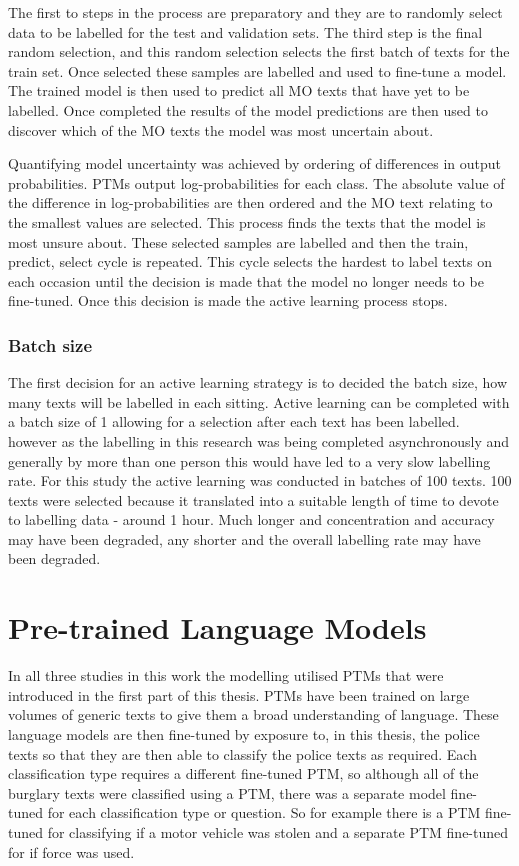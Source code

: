 The first to steps in the process are preparatory and they are to randomly select data to be labelled for the test and validation sets. The third step is the final random selection, and this random selection selects the first batch of texts for the train set. Once selected these samples are labelled and used to fine-tune a model. The trained model is then used to predict all MO texts that have yet to be labelled. Once completed the results of the model predictions are then used to discover which of the MO texts the model was most uncertain about. 

Quantifying model uncertainty was achieved by ordering of differences in output probabilities. PTMs output log-probabilities for each class. The absolute value of the difference in log-probabilities are then ordered and the MO text relating to the smallest values are selected. This process finds the texts that the model is most unsure about. These selected samples are labelled and then the train, predict, select cycle is repeated. This cycle selects the hardest to label texts on each occasion until the decision is made that the model no longer needs to be fine-tuned. Once this decision is made the active learning process stops. 


\subsubsection{Batch size}
The first decision for an active learning strategy is to decided the batch size, how many texts will be labelled in each sitting. Active learning can be completed with a batch size of 1 allowing for a selection after each text has been labelled. however as the labelling in this research was being completed asynchronously and generally by more than one person this would have led to a very slow labelling rate. For this study the active learning was conducted in batches of 100 texts. 100 texts were selected because it translated into a suitable length of time to devote to labelling data - around 1 hour. Much longer and concentration and accuracy may have been degraded, any shorter and the overall labelling rate may have been degraded. 


\section{Pre-trained Language Models} In all three studies in this work the modelling utilised PTMs that were introduced in the first part of this thesis. PTMs have been trained on large volumes of generic texts to give them a broad understanding of language. These language models are then fine-tuned by exposure to, in this thesis, the police texts so that they are then able to classify the police texts as required. Each classification type requires a different fine-tuned PTM, so although all of the burglary texts were classified using a PTM, there was a separate model fine-tuned for each classification type or question. So for example there is a PTM fine-tuned for classifying if a motor vehicle was stolen and a separate PTM fine-tuned for if force was used. 

